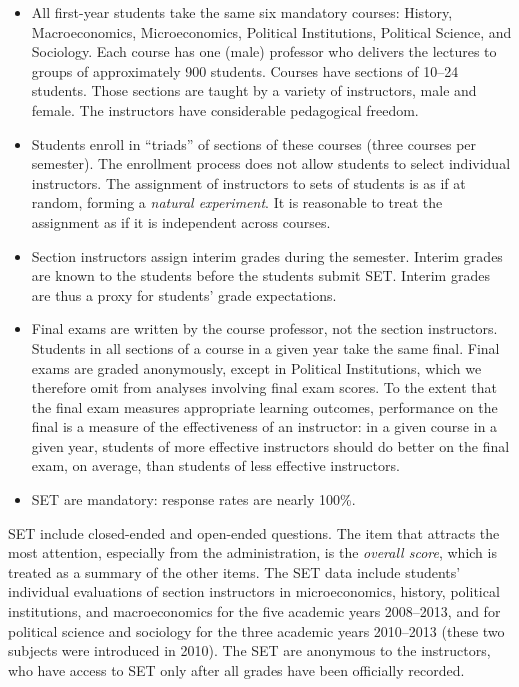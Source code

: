 \documentclass[12pt]{article}
\begin{document}
\begin{itemize}
   \item All first-year students take the same six mandatory courses: 
            History, Macroeconomics, Microeconomics, 
            Political Institutions, Political Science, and Sociology.
            Each course has one (male) professor
            who delivers the lectures to groups of approximately 900 students. 
            Courses have sections of 10--24 students. 
            Those sections are taught by a variety of instructors, male and female.
            The instructors have considerable pedagogical freedom.
    
   \item Students enroll in ``triads'' of sections of these courses (three courses per semester). 
            The enrollment process does not allow students to select individual instructors.
            The assignment of instructors to sets of students is as if at random,
            forming a \emph{natural experiment}.
            It is reasonable to treat the assignment as if it is independent across 
            courses.
            
   \item Section instructors assign interim grades during the semester.
            Interim grades are known to the students before the students submit SET.
            Interim grades are thus a proxy for students' grade expectations.
            
   \item Final exams are written by the course professor, not the section instructors.
            Students in all sections of a course in a given year take the same final.
            Final exams are graded anonymously, except in Political
            Institutions, which we therefore omit from analyses involving final exam scores.
            To the extent that the final exam measures appropriate learning outcomes, 
            performance on the final is a measure of the effectiveness of
            an instructor: in a given course in a given year,
            students of more effective instructors should do better on
            the final exam, on average, than students of less effective instructors.
    
   \item SET are mandatory: response rates are nearly 100\%.
   
\end{itemize}

SET include closed-ended and open-ended questions.
The item that attracts the most attention, especially from the administration,
is the \emph{overall score}, 
which is treated as a summary of the other items.
The SET data include students' individual evaluations of section
instructors in microeconomics, history, political institutions, and 
macroeconomics for the five academic years 2008--2013, and for 
political science and sociology for the three academic years 2010--2013 
(these two subjects were introduced in 2010). 
The SET are anonymous to the instructors, who have access to SET only after 
all grades have been officially recorded.  
\end{document}
